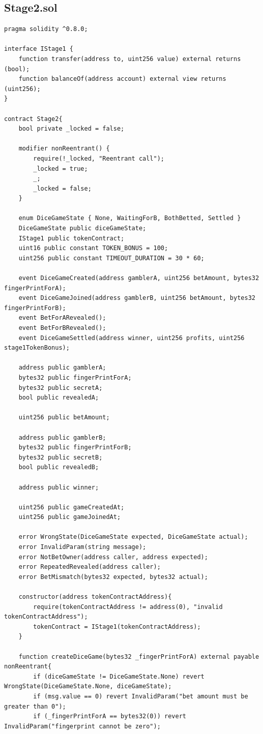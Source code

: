 \documentclass[10pt,a4paper]{article}
\begin{document}
\subsection*{Stage2.sol}
\begin{lstlisting}[caption={Stage2.sol}]
pragma solidity ^0.8.0;

interface IStage1 {
    function transfer(address to, uint256 value) external returns (bool);
    function balanceOf(address account) external view returns (uint256);
}

contract Stage2{
    bool private _locked = false;
    
    modifier nonReentrant() {
        require(!_locked, "Reentrant call");
        _locked = true;
        _;
        _locked = false;
    }
    
    enum DiceGameState { None, WaitingForB, BothBetted, Settled }
    DiceGameState public diceGameState;
    IStage1 public tokenContract;
    uint16 public constant TOKEN_BONUS = 100; 
    uint256 public constant TIMEOUT_DURATION = 30 * 60;

    event DiceGameCreated(address gamblerA, uint256 betAmount, bytes32 fingerPrintForA);
    event DiceGameJoined(address gamblerB, uint256 betAmount, bytes32 fingerPrintForB);
    event BetForARevealed();
    event BetForBRevealed();
    event DiceGameSettled(address winner, uint256 profits, uint256 stage1TokenBonus);

    address public gamblerA;
    bytes32 public fingerPrintForA;
    bytes32 public secretA;
    bool public revealedA;

    uint256 public betAmount;

    address public gamblerB;
    bytes32 public fingerPrintForB;
    bytes32 public secretB;
    bool public revealedB;

    address public winner;
    
    uint256 public gameCreatedAt;
    uint256 public gameJoinedAt;

    error WrongState(DiceGameState expected, DiceGameState actual);
    error InvalidParam(string message);
    error NotBetOwner(address caller, address expected);
    error RepeatedRevealed(address caller);
    error BetMismatch(bytes32 expected, bytes32 actual);

    constructor(address tokenContractAddress){
        require(tokenContractAddress != address(0), "invalid tokenContractAddress");
        tokenContract = IStage1(tokenContractAddress);
    }

    function createDiceGame(bytes32 _fingerPrintForA) external payable nonReentrant{
        if (diceGameState != DiceGameState.None) revert WrongState(DiceGameState.None, diceGameState);
        if (msg.value == 0) revert InvalidParam("bet amount must be greater than 0");
        if (_fingerPrintForA == bytes32(0)) revert InvalidParam("fingerprint cannot be zero");


\end{lstlisting}
\end{document}
